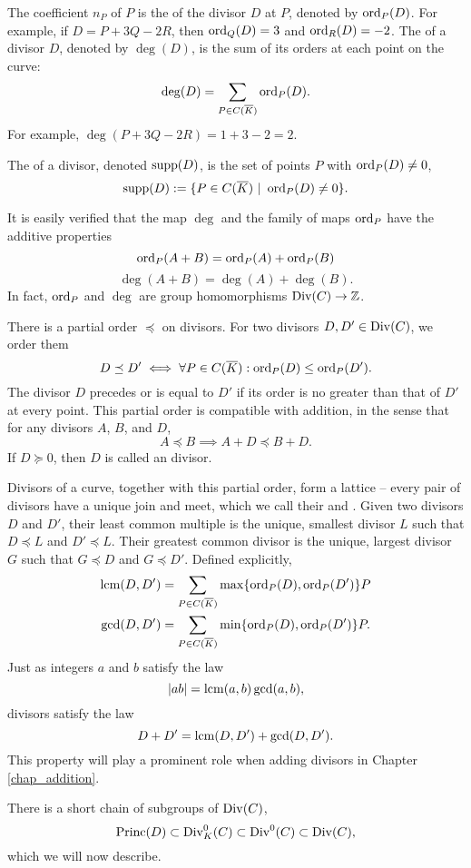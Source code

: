 The coefficient $n_P$ of $P$ is the  of the divisor $D$ at $P$, denoted by $\operatorname{ord}_P(D)$.
For example, if $D = P + 3Q - 2R$, then $\operatorname{ord}_Q(D) = 3$ and $\operatorname{ord}_R(D) = -2$.
The  of a divisor $D$, denoted by $\deg(D)$, is the sum of its orders at each point on the curve:
  \[ \deg(D) = \sum_{P \in C(\overline K)} \operatorname{ord}_P(D). \]
For example, $\deg(P + 3Q - 2R) = 1 + 3 - 2 = 2$.

The  of a divisor, denoted $\operatorname{supp}(D)$, is the set of points $P$ with $\operatorname{ord}_P(D) \neq 0$,
\[ \operatorname{supp}(D) := \{ P \in C(\overline K) ~|~ \operatorname{ord}_P(D) \neq 0 \}. \]

It is easily verified that the map $\deg$ and the family of maps $\operatorname{ord}_P$ have the additive properties
  \[ \operatorname{ord}_P(A + B) = \operatorname{ord}_P(A) + \operatorname{ord}_P(B) \]
  \[ \deg(A + B) = \deg(A) + \deg(B). \]
In fact, $\operatorname{ord}_P$ and $\deg$ are group homomorphisms $\operatorname{Div}(C) \to \mathbb{Z}$.

There is a partial order $\preceq$ on divisors.
For two divisors $D,D' \in \operatorname{Div}(C)$,
we order them
  \[ D \preceq D' \iff \forall P \in C(\overline K) : \operatorname{ord}_P(D) \leq \operatorname{ord}_P(D'). \]
The divisor $D$ precedes or is equal to $D'$
if its order is no greater than that of $D'$ at every point.
This partial order is compatible with addition, in the sense that for any divisors $A$, $B$, and $D$,
  \[ A \preceq B \implies A + D \preceq B + D. \]
If $D \succeq 0$, then $D$ is called an  divisor.

Divisors of a curve, together with this partial order, form a lattice --
every pair of divisors have a unique join and meet,
which we call their  and .
Given two divisors $D$ and $D'$, their least common multiple is the unique, smallest divisor $L$
such that $D \preceq L$ and $D' \preceq L$.
Their greatest common divisor is the unique, largest divisor $G$ such that $G \preceq D$ and $G \preceq D'$.
Defined explicitly,
\begin{align*}
  \operatorname{lcm}(D, D') &= \sum_{P \in C(\overline K)}\max\{\operatorname{ord}_P(D), \operatorname{ord}_P(D')\}P \\
  \gcd(D, D') &= \sum_{P \in C(\overline K)}\min\{\operatorname{ord}_P(D), \operatorname{ord}_P(D')\}P.
\end{align*}
Just as integers $a$ and $b$ satisfy the law
  \[ \left| ab \right| = \operatorname{lcm}(a,b)\gcd(a,b), \]
divisors satisfy the law
  \[ D + D' = \operatorname{lcm}(D, D') + \gcd(D, D'). \]
This property will play a prominent role when adding divisors in Chapter \ref{chap_addition}.

There is a short chain of subgroups of $\operatorname{Div}(C)$,
\[ \operatorname{Princ}(D) \subset \operatorname{Div}_K^0(C) \subset \operatorname{Div}^0(C) \subset \operatorname{Div}(C), \]
which we will now describe.

